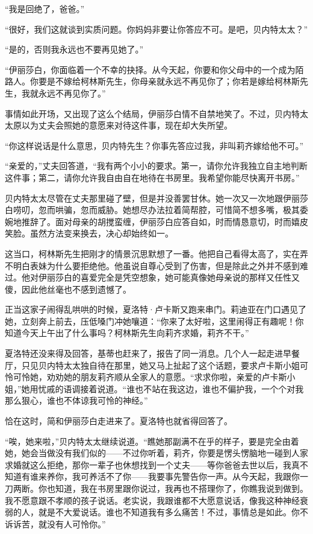 \par “我是回绝了，爸爸。”
\par “很好，我们这就谈到实质问题。你妈妈非要让你答应不可。是吧，贝内特太太？”
\par “是的，否则我永远也不要再见她了。”
\par “伊丽莎白，你面临着一个不幸的抉择。从今天起，你要和你父母中的一个成为陌路人。你要是不嫁给柯林斯先生，你母亲就永远不再见你了；你若是嫁给柯林斯先生，我就永远不再见你了。”
\par 事情如此开场，又出现了这么个结局，伊丽莎白情不自禁地笑了。不过，贝内特太太原以为丈夫会照她的意愿来对待这件事，现在却大失所望。
\par “你这样说话是什么意思，贝内特先生？你事先答应过我，非叫莉齐嫁给他不可。”
\par “亲爱的，”丈夫回答道，“我有两个小小的要求。第一，请你允许我独立自主地判断这件事；第二，请你允许我自由自在地待在书房里。我希望你能尽快离开书房。”
\par 贝内特太太尽管在丈夫那里碰了壁，但是并没善罢甘休。她一次又一次地跟伊丽莎白唠叨，忽而哄骗，忽而威胁。她想尽办法拉着简帮腔，可惜简不想多嘴，极其委婉地推辞了。面对母亲的胡搅蛮缠，伊丽莎白应答自如，时而情恳意切，时而嬉皮笑脸。虽然方法变来换去，决心却始终如一。
\par 这当口，柯林斯先生把刚才的情景沉思默想了一番。他把自己看得太高了，实在弄不明白表妹为什么要拒绝他。他虽说自尊心受到了伤害，但是除此之外并不感到难过。他对伊丽莎白的喜爱完全是凭空想象，她可能真像她母亲说的那样又任性又傻，因此他丝毫也不感到遗憾了。
\par 正当这家子闹得乱哄哄的时候，夏洛特·卢卡斯又跑来串门。莉迪亚在门口遇见了她，立刻奔上前去，压低嗓门冲她嚷道：“你来了太好啦，这里闹得正有趣呢！你知道今天上午出了什么事吗？柯林斯先生向莉齐求婚，莉齐不干。”
\par 夏洛特还没来得及回答，基蒂也赶来了，报告了同一消息。几个人一起走进早餐厅，只见贝内特太太独自待在那里，她又马上扯起了这个话题，要求卢卡斯小姐可怜可怜她，劝劝她的朋友莉齐顺从全家人的意愿。“求求你啦，亲爱的卢卡斯小姐，”她用忧戚的语调接着说道。“谁也不站在我这边，谁也不偏护我，一个个对我那么狠心，谁也不体谅我可怜的神经。”
\par 恰在这时，简和伊丽莎白走进来了。夏洛特也就省得回答了。
\par “唉，她来啦，”贝内特太太继续说道。“瞧她那副满不在乎的样子，要是完全由着她，她会当做没有我们似的——不过你听着，莉齐，你要是愣头愣脑地一碰到人家求婚就这么拒绝，那你一辈子也休想找到一个丈夫——等你爸爸去世以后，我真不知道有谁来养你，我可养活不了你——我要事先警告你一声。从今天起，我跟你一刀两断。你也知道，我在书房里跟你说过，我再也不搭理你了，你瞧我说到做到。我不愿意跟不孝顺的孩子说话。老实说，我跟谁都不大愿意说话，像我这种神经衰弱的人，就是不大爱说话。谁也不知道我有多么痛苦！不过，事情总是如此。你不诉诉苦，就没有人可怜你。”

